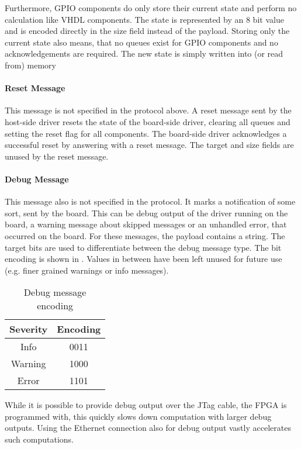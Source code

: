 \documentclass{report}
\begin{document}
Furthermore, GPIO components do only store their current state and perform no calculation like VHDL components. The state is represented by an 8 bit value and is encoded directly in the size field instead of the payload. Storing only the current state also means, that no queues exist for GPIO components and no acknowledgements are required. The new state is simply written into (or read from) memory

\paragraph{Reset Message}
This message is not specified in the protocol above. A reset message sent by the host-side driver resets the state of the board-side driver, clearing all queues and setting the reset flag for all components. The board-side driver acknowledges a successful reset by answering with a reset message. 
The target and size fields are unused by the reset message.

\paragraph{Debug Message}
This message also is not specified in the protocol. It marks a notification of some sort, sent by the board. This can be debug output of the driver running on the board, a warning message about skipped messages or an unhandled error, that occurred on the board. For these messages, the payload contains a string.
The target bits are used to differentiate between the debug message type. The bit encoding is shown in . Values in between have been left unused for future use (e.g. finer grained warnings or info messages).

\begin{table}[h]
\centering
\begin{tabular}{ c | c } 
Severity & Encoding \\ \hline
Info & 0011 \\
Warning & 1000 \\
Error &  1101 \\
 \end{tabular}
\caption{Debug message encoding}
\label{tab:protoDebug}
\end{table}

While it is possible to provide debug output over the JTag cable, the FPGA is programmed with, this quickly slows down computation with larger debug outputs. Using the Ethernet connection also for debug output vastly accelerates such computations.
\end{document}
